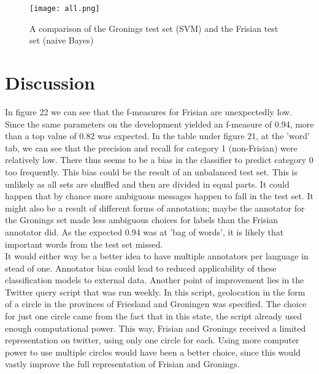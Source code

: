 \documentclass[
10pt, %
a4paper, %
oneside, %
headinclude,footinclude, %
] {book}%
\begin{document}
\begin{figure}[H]
  \texttt{[image: all.png]}
  \caption{A comparison of the Gronings test set (SVM) and the Frisian test set (naive Bayes)}
\end{figure} 

\section{Discussion}

In figure 22 we can see that the f-measures for Frisian are unexpectedly low. Since the same parameters on the development yielded an f-measure of 0.94, more than a top value of 0.82 was expected. In the table under figure 21, at the 'word' tab, we can see that the precision and recall for category 1 (non-Frisian) were relatively low. There thus seems to be a bias in the classifier to predict category 0 too frequently. This bias could be the result of an unbalanced test set. This is unlikely as all sets are shuffled and then are divided in equal parts. It could happen that by chance more ambiguous messages happen to fall in the test set. It might also be a result of different forms of annotation; maybe the annotator for the Gronings set made less ambiguous choices for labels than the Frisian annotator did. As the expected 0.94 was at 'bag of words', it is likely that important words from the test set missed.\\

It would either way be a better idea to have multiple annotators per language in stead of one. Annotator bias could lead to reduced applicability of these classification models to external data. Another point of improvement lies in the Twitter query script that was run weekly. In this script, geolocation in the form of a circle in the provinces of Friesland and Groningen was specified. The choice for just one circle came from the fact that in this state, the script already used enough computational power. This way, Frisian and Gronings received a limited representation on twitter, using only one circle for each. Using more computer power to use multiple circles would have been a better choice, since this would vastly improve the full representation of Frisian and Gronings.  \\
\end{document}
